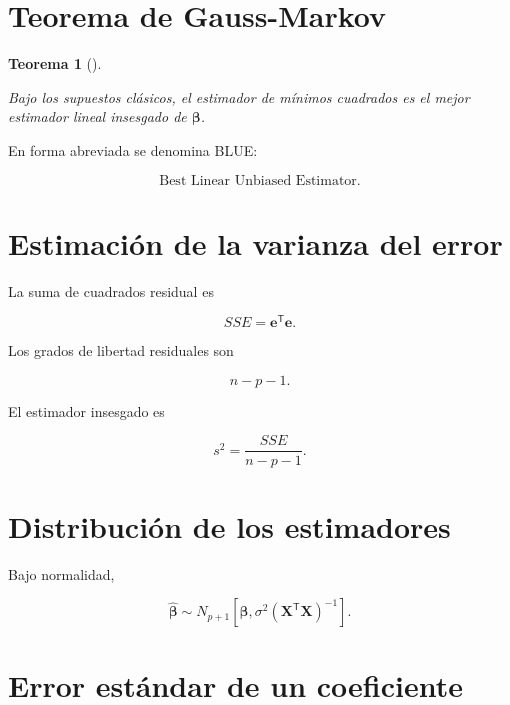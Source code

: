 \documentclass[
  spanish,
  10.5pt,
  letterpaper,
  DIV=11,
  numbers=noendperiod,
  oneside,
  open=any]{scrreprt}
\theoremstyle{definition}
\theoremstyle{definition}
\theoremstyle{plain}
\newtheorem{theorem}{Teorema}[chapter]
\theoremstyle{remark}
\begin{document}
\section*{Teorema de Gauss-Markov}\label{teorema-de-gauss-markov}


\begin{theorem}[]\protect\hypertarget{thm-gauss-markov-multiple}{}\label{thm-gauss-markov-multiple}

Bajo los supuestos clásicos, el estimador de mínimos cuadrados es el
mejor estimador lineal insesgado de \(\boldsymbol{\beta}\).

\end{theorem}

En forma abreviada se denomina BLUE:

\[
\text{Best Linear Unbiased Estimator}.
\]

\section*{Estimación de la varianza del
error}\label{estimaciuxf3n-de-la-varianza-del-error}


La suma de cuadrados residual es

\[
SSE
=
\mathbf{e}^{\mathsf T}\mathbf{e}.
\]

Los grados de libertad residuales son

\[
n-p-1.
\]

El estimador insesgado es

\[
s^2
=
\frac{
SSE
}{
n-p-1
}.
\]

\section*{Distribución de los
estimadores}\label{distribuciuxf3n-de-los-estimadores}


Bajo normalidad,

\[
\widehat{\boldsymbol{\beta}}
\sim
N_{p+1}
\left[
\boldsymbol{\beta},
\sigma^2
\left(
\mathbf{X}^{\mathsf T}\mathbf{X}
\right)^{-1}
\right].
\]

\section*{Error estándar de un
coeficiente}\label{error-estuxe1ndar-de-un-coeficiente}
\end{document}
